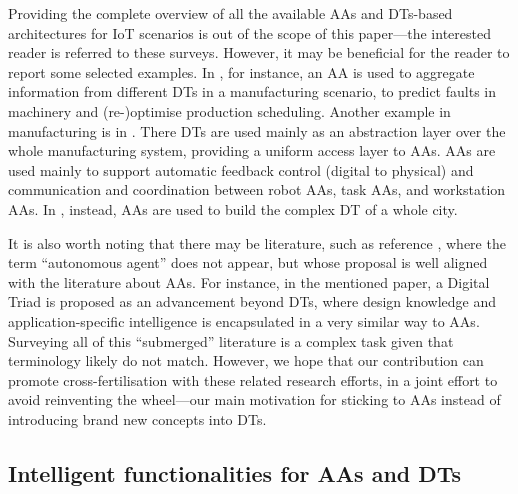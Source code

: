 Providing the complete overview 
of all the available AAs and DTs-based architectures for IoT scenarios 
is out of the scope of this paper---the interested reader is referred to these surveys. 
However, it may be beneficial for the reader
to report some selected examples.
In \cite{Nie2022}, for instance, 
    an AA is used to aggregate information from different DTs in a manufacturing scenario, 
    to predict faults in machinery and (re-)optimise production scheduling.
Another example in manufacturing is in \cite{Xu2024}. 
    There DTs are used mainly as an abstraction layer over the whole manufacturing system, 
    providing a uniform access layer to AAs. 
    AAs are used mainly to support automatic feedback control (digital to physical) 
    and communication and coordination between robot AAs, task AAs, and workstation AAs.
In \cite{DBLP:conf/pads/ClemenALOOSG21}, instead, 
    AAs are used to build the complex DT of a whole city.

It is also worth noting that there may be literature, such as reference \cite{DBLP:journals/jiii/BiZWL22}, 
where the term ``autonomous agent'' does not appear, 
but whose proposal is well aligned with the literature about AAs. 
For instance, in the mentioned paper, 
a Digital Triad is proposed as an advancement beyond DTs, 
where design knowledge and application-specific intelligence is encapsulated 
in a very similar way to AAs. 
Surveying all of this ``submerged'' literature is a complex task given that terminology likely do not match. 
However, we hope that our contribution can promote cross-fertilisation with these related research efforts, 
in a joint effort to avoid reinventing the wheel---our main motivation for sticking to AAs instead of introducing brand new concepts into DTs.
    
\subsection{Intelligent functionalities for AAs and DTs}
\label{ssec:functions}

